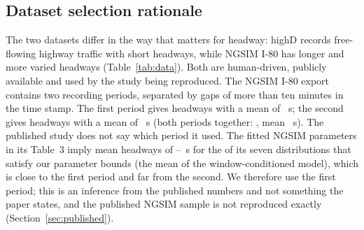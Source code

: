 \documentclass[11pt,a4paper]{article}
\numberwithin{equation}{section}
\begin{document}
\subsection{Dataset selection rationale}\label{sec:selection}
The two datasets differ in the way that matters for headway: highD records free-flowing highway traffic with short
headways, while NGSIM I-80 has longer and more varied headways (Table~\ref{tab:data}). Both are human-driven, publicly available and used by the study being reproduced.
The NGSIM I-80 export contains two recording periods, separated by gaps of more than ten minutes in the time stamp. The first period gives \ngN{}
headways with a mean of \ngMean~s; the second gives \ngPeriodTwoN{} headways with a mean of \ngPeriodTwoMean~s (both periods together: \ngBothN{}, mean \ngBothMean~s). The published study does
not say which period it used. The fitted NGSIM parameters in its Table~3 imply mean headways of \ngImpliedLo--\ngImpliedHi~s for the \ngImpliedN{} of its seven distributions that satisfy our parameter bounds (the mean of the
window-conditioned model), which is close to the first period and far from the second. We therefore use the first period; this is an inference from the published numbers and not something the paper states, and
the published NGSIM sample is not reproduced exactly (Section~\ref{sec:published}).
\end{document}
